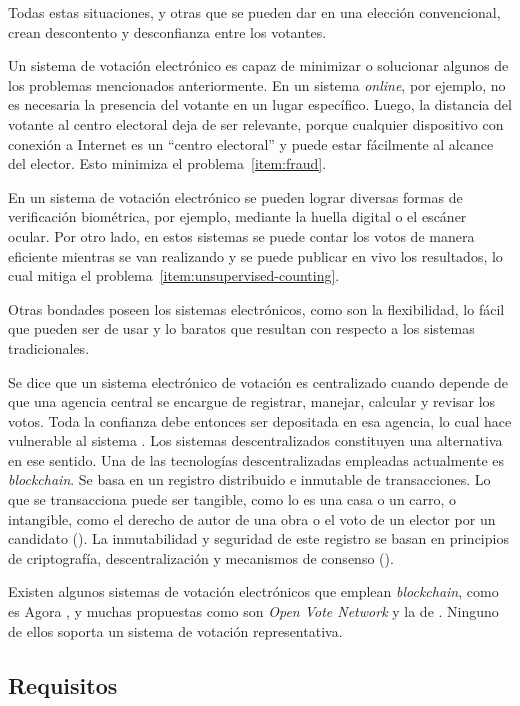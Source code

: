Todas estas situaciones, y otras que se pueden dar en una elección
convencional, crean descontento y desconfianza entre los votantes.

Un sistema de votación electrónico es capaz de minimizar o solucionar
algunos de los problemas mencionados anteriormente. En un sistema
\emph{online}, por ejemplo, no es necesaria la presencia del votante en
un lugar específico. Luego, la distancia del votante al centro electoral
deja de ser relevante, porque cualquier dispositivo con conexión a
Internet es un ``centro electoral'' y puede estar fácilmente al alcance
del elector. Esto minimiza el problema~\ref{item:fraud}.

En un sistema de votaci\'on electr\'onico se  pueden lograr diversas formas de verificaci\'on biom\'etrica, por ejemplo, mediante la huella digital o el esc\'aner ocular.  Por otro lado, en estos sistemas se puede contar los votos de manera eficiente mientras se van realizando y se  puede publicar en vivo los resultados, lo cual mitiga el problema~\ref{item:unsupervised-counting}.  

Otras bondades poseen los sistemas electrónicos, como son la flexibilidad, lo fácil que pueden ser de usar y lo baratos que resultan con respecto a los sistemas tradicionales. 

Se dice que un sistema electrónico de votaci\'on es centralizado cuando depende de que una agencia central se encargue de registrar, manejar, calcular y revisar los votos. Toda la confianza debe entonces ser depositada en esa agencia, lo cual hace vulnerable al sistema \citep{chica2018weaknesses}. Los sistemas descentralizados constituyen una alternativa en ese sentido. Una de las tecnologías descentralizadas empleadas actualmente es \textit{blockchain}.   Se basa en un registro distribuido e inmutable  de transacciones. Lo que se transacciona puede ser tangible, como lo es  una casa o un carro,  o intangible, como el derecho de autor de una obra o el voto de un elector por un candidato (\cite{blockchain-ibm}). La inmutabilidad y seguridad de este registro se basan en principios de  criptografía, descentralizaci\'on y mecanismos de consenso (\cite{blockch-security-ibm}). 

Existen algunos sistemas de votación electrónicos que emplean \emph{blockchain}, como es Agora \citep{agora}, y muchas propuestas como son \emph{Open Vote Network} \citep{ovn} y la de \cite{borda_count}. Ninguno de ellos soporta un sistema de votaci\'on representativa.

\subsection{Requisitos}

